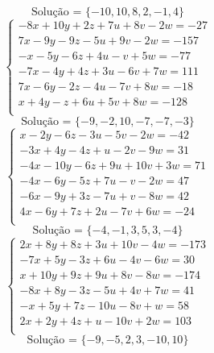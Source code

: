 \documentclass[12pt,oneside,a4paper]{article}
\begin{document}
\begin{equation*}
\text{Solução = }\{-10,10,8,2,-1,4\}
\end{equation*}
\vspace{\baselineskip}
\begin{equation*}
\begin{cases}
-8x+10y+2z+7u+8v-2w=-27 \\
7x-9y-9z-5u+9v-2w=-157 \\
-x-5y-6z+4u-v+5w=-77 \\
-7x-4y+4z+3u-6v+7w=111 \\
7x-6y-2z-4u-7v+8w=-18 \\
x+4y-z+6u+5v+8w=-128 \\
\end{cases}
\end{equation*}
\begin{equation*}
\text{Solução = }\{-9,-2,10,-7,-7,-3\}
\end{equation*}
\vspace{\baselineskip}
\begin{equation*}
\begin{cases}
x-2y-6z-3u-5v-2w=-42 \\
-3x+4y-4z+u-2v-9w=31 \\
-4x-10y-6z+9u+10v+3w=71 \\
-4x-6y-5z+7u-v-2w=47 \\
-6x-9y+3z-7u+v-8w=42 \\
4x-6y+7z+2u-7v+6w=-24 \\
\end{cases}
\end{equation*}
\begin{equation*}
\text{Solução = }\{-4,-1,3,5,3,-4\}
\end{equation*}
\vspace{\baselineskip}
\begin{equation*}
\begin{cases}
2x+8y+8z+3u+10v-4w=-173 \\
-7x+5y-3z+6u-4v-6w=30 \\
x+10y+9z+9u+8v-8w=-174 \\
-8x+8y-3z-5u+4v+7w=41 \\
-x+5y+7z-10u-8v+w=58 \\
2x+2y+4z+u-10v+2w=103 \\
\end{cases}
\end{equation*}
\begin{equation*}
\text{Solução = }\{-9,-5,2,3,-10,10\}
\end{equation*}
\end{document}
